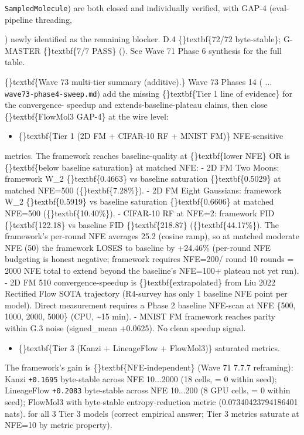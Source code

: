 \documentclass{article}
\begin{document}
\texttt{SampledMolecule}) are both closed and individually verified, with GAP-4 (eval-pipeline  threading,

) newly identified as the remaining blocker. D.4 \{\}textbf\{72/72 byte-stable\}; G-MASTER \{\}textbf\{7/7 PASS\} (). See Wave 71 Phase 6 synthesis for the full table.

\{\}textbf\{Wave 73 multi-tier summary (additive).\} Wave 73 Phases 14 ( ... \texttt{wave73-phase4-sweep.md}) add the missing \{\}textbf\{Tier 1 line of evidence\} for the convergence- speedup and extends-baseline-plateau claims, then close \{\}textbf\{FlowMol3 GAP-4\} at the wire level:

\begin{itemize}
\item \{\}textbf\{Tier 1 (2D FM + CIFAR-10 RF + MNIST FM)\}  NFE-sensitive
\end{itemize}
metrics. The framework reaches baseline-quality at \{\}textbf\{lower NFE\} OR is \{\}textbf\{below baseline saturation\} at matched NFE: - 2D FM Two Moons: framework W\_2 \{\}textbf\{0.4663\} vs baseline saturation \{\}textbf\{0.5029\} at matched NFE=500 (\{\}textbf\{7.28\%\}). - 2D FM Eight Gaussians: framework W\_2 \{\}textbf\{0.5919\} vs baseline saturation \{\}textbf\{0.6606\} at matched NFE=500 (\{\}textbf\{10.40\%\}). - CIFAR-10 RF at NFE=2: framework FID \{\}textbf\{122.18\} vs baseline FID \{\}textbf\{218.87\} (\{\}textbf\{44.17\%\}). The framework's per-round NFE averages 25.2 (cosine ramp), so at matched moderate NFE (50) the framework LOSES to baseline by +24.46\% (per-round NFE budgeting is honest negative; framework requires NFE=200/ round  10 rounds = 2000 NFE total to extend beyond the baseline's NFE=100+ plateau  not yet run). - 2D FM 510 convergence-speedup is \{\}textbf\{extrapolated\} from Liu 2022 Rectified Flow SOTA trajectory (R4-survey has only 1 baseline NFE point per model). Direct measurement requires a Phase 2 baseline NFE-scan at NFE  \{500, 1000, 2000, 5000\} (CPU, \textasciitilde{}15 min). - MNIST FM framework reaches parity within G.3 noise (signed\_mean +0.0625). No clean speedup signal.

\begin{itemize}
\item \{\}textbf\{Tier 3 (Kanzi + LineageFlow + FlowMol3)\}  saturated metrics.
\end{itemize}
The framework's gain is \{\}textbf\{NFE-independent\} (Wave 71 7.7.7 reframing): Kanzi \texttt{+0.1695} byte-stable across NFE 10...2000 (18 cells,  = 0 within seed); LineageFlow \texttt{+0.2083} byte-stable across NFE 10...200 (8 GPU cells,  = 0 within seed); FlowMol3  with byte-stable entropy-reduction metric (0.07340423794186401 nats).    for all 3 Tier 3 models (correct empirical answer; Tier 3 metrics saturate at NFE=10 by metric property).
\end{document}
